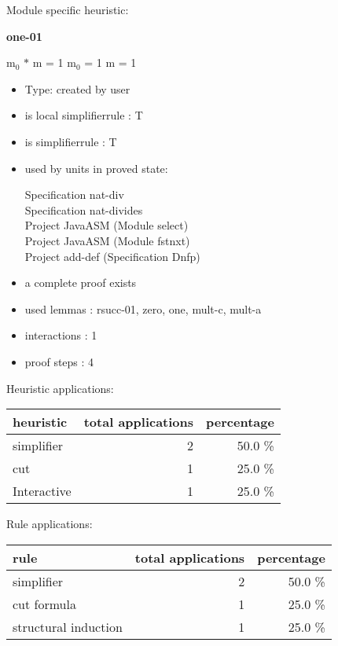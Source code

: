 \documentclass[a4paper]{article}
\begin{document}
Module specific heuristic:

\pagebreak

{\LARGE\bf one-01}\label{lemma-one-01}

\medskip

 \Fol $\mbox{m}_{0}$ $*$ m = 1 \Equiv $\mbox{m}_{0}$ = 1 \And m = 1

\begin{itemize}

\item Type: created by user

\item is local simplifierrule : T
\item is simplifierrule : T
\item used by units in proved state:

Specification nat-div \\
Specification nat-divides \\
Project JavaASM (Module select) \\
Project JavaASM (Module fstnxt) \\
Project add-def (Specification Dnfp)
\item       a complete proof exists
\item       used lemmas  : rsucc-01, zero, one, mult-c, mult-a
\item       interactions : 1
\item       proof steps  : 4
\end{itemize}

\medskip


Heuristic applications:

\begin{supertabular}{l|r|r}
heuristic	& total applications & percentage \\ \hline
simplifier & 2 & 50.0 \% \\
cut & 1 & 25.0 \% \\
Interactive & 1 & 25.0 \% \\

\end{supertabular}

Rule applications:

\begin{supertabular}{l|r|r}
rule	        & total applications & percentage \\ \hline
simplifier & 2 & 50.0 \% \\
cut formula & 1 & 25.0 \% \\
structural induction & 1 & 25.0 \% \\

\end{supertabular}
\end{document}
